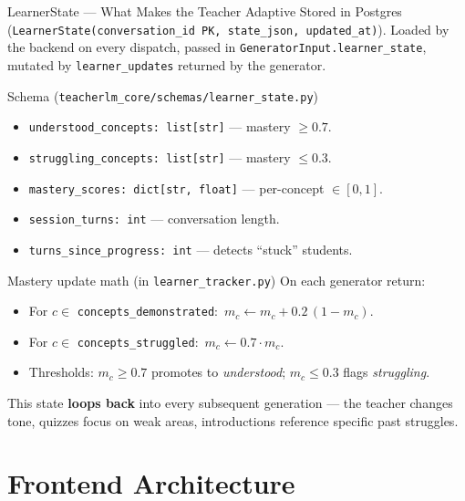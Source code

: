 \documentclass[aspectratio=169, 10pt]{beamer}
\begin{document}
\begin{frame}{LearnerState --- What Makes the Teacher Adaptive}
  \scriptsize
  Stored in Postgres (\texttt{LearnerState(conversation\_id PK, state\_json, updated\_at)}).
  Loaded by the backend on every dispatch, passed in
  \texttt{GeneratorInput.learner\_state}, mutated by
  \texttt{learner\_updates} returned by the generator.

  \begin{block}{Schema (\texttt{teacherlm\_core/schemas/learner\_state.py})}
    \scriptsize
    \begin{itemize}
      \setlength\itemsep{0pt}
      \item \texttt{understood\_concepts: list[str]} --- mastery $\geq 0.7$.
      \item \texttt{struggling\_concepts: list[str]} --- mastery $\leq 0.3$.
      \item \texttt{mastery\_scores: dict[str, float]} --- per-concept $\in [0,1]$.
      \item \texttt{session\_turns: int} --- conversation length.
      \item \texttt{turns\_since\_progress: int} --- detects ``stuck'' students.
    \end{itemize}
  \end{block}

  \begin{exampleblock}{Mastery update math (in \texttt{learner\_tracker.py})}
    \scriptsize
    On each generator return:
    \begin{itemize}
      \setlength\itemsep{0pt}
      \item For $c \in$ \texttt{concepts\_demonstrated}:\
            $m_c \leftarrow m_c + 0.2\,(1 - m_c)$.
      \item For $c \in$ \texttt{concepts\_struggled}:\
            $m_c \leftarrow 0.7 \cdot m_c$.
      \item Thresholds: $m_c \geq 0.7$ promotes to \emph{understood};
            $m_c \leq 0.3$ flags \emph{struggling}.
    \end{itemize}
  \end{exampleblock}

  \scriptsize
  This state \textbf{loops back} into every subsequent
  generation --- the teacher changes tone, quizzes focus on weak areas,
  introductions reference specific past struggles.
\end{frame}

\section{Frontend Architecture}
\end{document}
